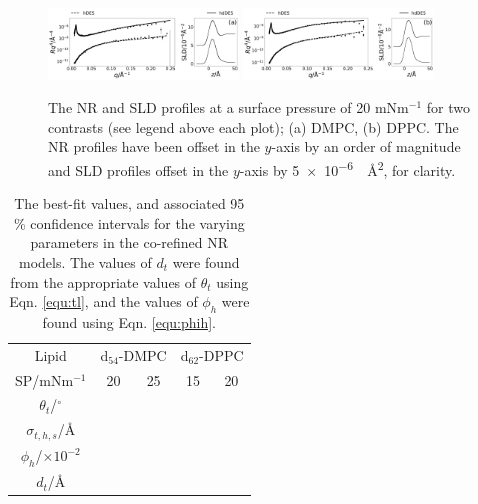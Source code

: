 \documentclass[twocolumn,a4paper]{paper}
\begin{document}
%
\begin{figure}
	\centering
	\includegraphics[width=0.45\textwidth]{figures/dmpc_20n_ref_sld}
	\includegraphics[width=0.45\textwidth]{figures/dppc_20n_ref_sld}
	\caption{\small The NR and SLD profiles at a surface pressure of 20 mNm$^{-1}$ for two contrasts (see legend above each plot); (a) DMPC, (b) DPPC. The NR profiles have been offset in the $y$-axis by an order of magnitude and SLD profiles offset in the $y$-axis by \SI{5e-6}{\per\square\angstrom}, for clarity.}
	\label{fig:neutron}
\end{figure}
%
%
\begin{table}
  \centering
	\caption{\label{tab:neutron}\small The best-fit values, and associated 95 \% confidence intervals for the varying parameters in the co-refined NR models. The values of $d_t$ were found from the appropriate values of $\theta_t$ using Eqn. \ref{equ:tl}, and the values of $\phi_h$ were found using Eqn. \ref{equ:phih}.}
	\begin{tabular}{ccccc}
    Lipid & \multicolumn{2}{c}{d$_{54}$-DMPC} & \multicolumn{2}{c}{d$_{62}$-DPPC} \\
    SP/mNm$^{-1}$ & 20 & 25 & 15 & 20 \\
		\hline
		$\theta_t$/$^\circ$ &  &  &  &  \\
		$\sigma_{t,h,s}$/\AA &  &  &  &  \\
    \hline
    $\phi_h$/$\times10^{-2}$ &  &  &  &  \\
		$d_t$/\AA &  &  &  &  \\
	\end{tabular}
\end{table}
%
\end{document}
